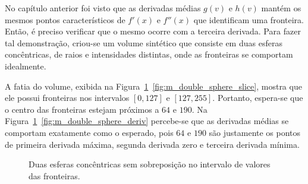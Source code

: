 	No capítulo anterior foi visto que as derivadas médias $ g(v) $ e $ h(v) $ mantém os mesmos pontos característicos de $ f'(x) $ e $ f''(x) $ que identificam uma fronteira. Então, é preciso verificar que o mesmo ocorre com a terceira derivada. Para fazer tal demonstração, criou-se um volume sintético que consiste em duas esferas concêntricas, de raios e intensidades distintas, onde as fronteiras se comportam idealmente.
	
	A fatia do volume, exibida na Figura~\ref{fig:m_double_sphere}~\ref{fig:m_double_sphere_slice}, mostra que ele possui fronteiras nos intervalos $ [0,127] $ e $ [127,255] $. Portanto, espera-se que o centro das fronteiras estejam próximos a $ 64 $ e $ 190 $. Na Figura~\ref{fig:m_double_sphere}~\ref{fig:m_double_sphere_deriv} percebe-se que as derivadas médias se comportam exatamente como o esperado, pois $ 64 $ e $ 190 $ são justamente os pontos de primeira derivada máxima, segunda derivada zero e terceira derivada mínima.
	
\begin{figure}[h]
	\centering
	\caption{Duas esferas concêntricas sem sobreposição no intervalo de valores das fronteiras.}
	\label{fig:m_double_sphere}
\end{figure}

